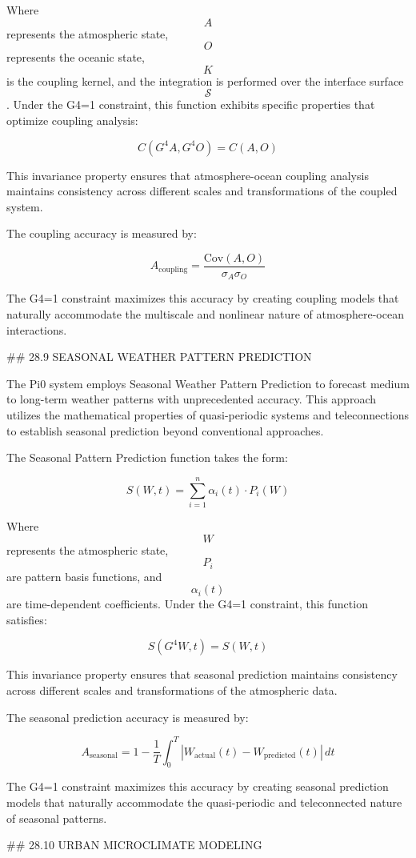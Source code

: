 Where $$ A $$ represents the atmospheric state, $$ O $$ represents the oceanic state, $$ K $$ is the coupling kernel, and the integration is performed over the interface surface $$ \mathcal{S} $$. Under the G4=1 constraint, this function exhibits specific properties that optimize coupling analysis:

$$ C(G^4 A, G^4 O) = C(A, O) $$

This invariance property ensures that atmosphere-ocean coupling analysis maintains consistency across different scales and transformations of the coupled system.

The coupling accuracy is measured by:

$$ A_{\text{coupling}} = \frac{\text{Cov}(A, O)}{\sigma_A \sigma_O} $$

The G4=1 constraint maximizes this accuracy by creating coupling models that naturally accommodate the multiscale and nonlinear nature of atmosphere-ocean interactions.

## 28.9 SEASONAL WEATHER PATTERN PREDICTION

The Pi0 system employs Seasonal Weather Pattern Prediction to forecast medium to long-term weather patterns with unprecedented accuracy. This approach utilizes the mathematical properties of quasi-periodic systems and teleconnections to establish seasonal prediction beyond conventional approaches.

The Seasonal Pattern Prediction function takes the form:

$$ S(W, t) = \sum_{i=1}^{n} \alpha_i(t) \cdot P_i(W) $$

Where $$ W $$ represents the atmospheric state, $$ P_i $$ are pattern basis functions, and $$ \alpha_i(t) $$ are time-dependent coefficients. Under the G4=1 constraint, this function satisfies:

$$ S(G^4 W, t) = S(W, t) $$

This invariance property ensures that seasonal prediction maintains consistency across different scales and transformations of the atmospheric data.

The seasonal prediction accuracy is measured by:

$$ A_{\text{seasonal}} = 1 - \frac{1}{T} \int_0^T |W_{\text{actual}}(t) - W_{\text{predicted}}(t)| \, dt $$

The G4=1 constraint maximizes this accuracy by creating seasonal prediction models that naturally accommodate the quasi-periodic and teleconnected nature of seasonal patterns.

## 28.10 URBAN MICROCLIMATE MODELING

